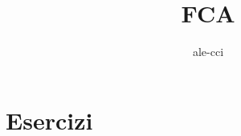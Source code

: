 \documentclass{article}
\title{FCA}
\author{ale-cci}
\begin{document}
\maketitle
\newpage

\section{Esercizi}

\end{document}

